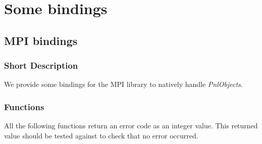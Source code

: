 \section{Some bindings}

\subsection{MPI bindings}
\subsubsection{Short Description}

We provide some bindings for the MPI library to natively handle {\it PnlObjects}.

\subsubsection{Functions}

All the following functions return an error code as an integer value. This
returned value should be tested against  to check that no
error occurred.

